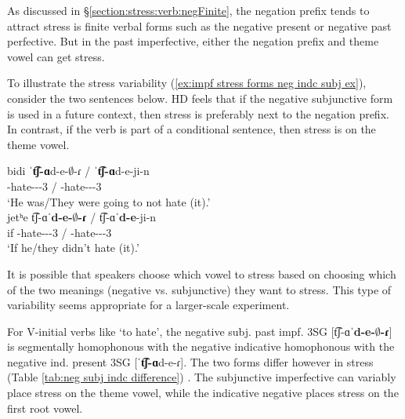 As discussed in \S\ref{section:stress:verb:negFinite}, the negation prefix tends to attract stress is finite verbal forms such as the negative present or negative past perfective. But in the past imperfective, either the negation prefix and theme vowel can get stress. 


To illustrate the stress variability (\ref{ex:impf stress forms neg indc subj ex}), consider the two sentences below. HD feels that if the negative subjunctive form is used in a future context, then stress is preferably next to the negation prefix. In contrast, if the verb is part of a conditional sentence, then stress is on the theme vowel. 

\begin{exe}
	\ex \label{ex:impf stress forms neg indc subj ex} 
	\begin{xlist}
		
		\ex \gll bidi ˈ\textbf{t͡ʃ-ɑ}d-e-$\emptyset$-ɾ  / ˈ\textbf{t͡ʃ-ɑ}{d-e}-ji-n 
		\\
		{\fut} {\neggloss}-hate-{\thgloss}-{\pst}-3{\sg} /  {\neggloss}-hate-{\thgloss}-{\pst}-3{\pl}
		\\
		\trans `He was/They were going to not hate (it).' 
		\\ 
		\ex \gll jetʰe t͡ʃ-ɑˈ\textbf{d-e-$\emptyset$-ɾ} / t͡ʃ-ɑˈ\textbf{d-e}-ji-n 
		\\
		if {\neggloss}-hate-{\thgloss}-{\pst}-3{\sg}  / {\neggloss}-hate-{\thgloss}-{\pst}-3{\pl} 
		\\
		\trans `If he/they didn't hate (it).' 
		\\ 
		
	\end{xlist}
\end{exe}

It is possible that speakers choose which vowel to stress based on choosing which of the two meanings (negative vs. subjunctive) they want to stress.  This type of variability seems appropriate for a larger-scale experiment. 

For V-initial verbs like `to hate', the negative subj. past impf. 3SG  [t͡ʃ-ɑˈ\textbf{d-e-$\emptyset$-ɾ}]  is segmentally homophonous with the negative indicative homophonous with the negative ind. present 3SG [ˈ\textbf{t͡ʃ-ɑ}{d-e-ɾ}]. The two forms differ however in stress (Table \ref{tab:neg subj indc difference})  \citep[cf.][67]{Avetisyan-2011-ComparativePhonoEastWest}. The subjunctive imperfective can variably place  stress on the theme vowel, while the indicative negative  places stress on the first root vowel. 

